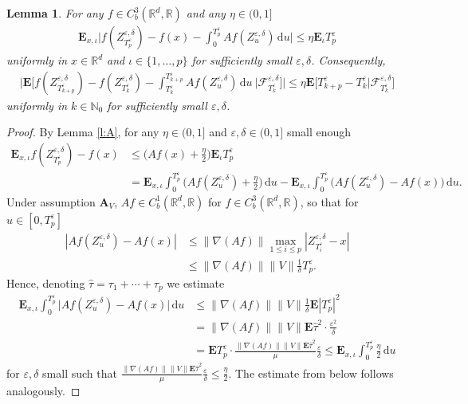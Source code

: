 \documentclass[10pt]{article}
\newcommand{\E}{\mathbf{E}}
\newcommand{\1}{1\!\!\!\;{\rm I}}
\theoremstyle{plain}
\newtheorem{lem}[thm]{Lemma}
\theoremstyle{definition}
\newcommand{\e}{\varepsilon}
\newcommand{\ba}{\begin{equation}\begin{aligned}}
\newcommand{\ea}{\end{aligned}\end{equation}}
\newcommand{\di}{\mathrm{d}}
\newcommand{\rF}{\mathscr{F}}
\newcommand{\bR}{\mathbb{R}}
\numberwithin{equation}{section}
\begin{document}
\begin{lem}
\label{l:estA}
For any $f\in C^3_b(\bR^d,\bR)$ and
any
$\eta\in(0,1]$
\ba
\E_{x,\iota}\Big| f(Z^{\e,\delta}_{T_p^\e}) - f(x) - \int_0^{T^\e_p} Af(Z^{\e,\delta}_u)\,\di u\Big|
\leq \eta \E_{\iota} T^\e_p
\ea
uniformly in $x\in\bR^d$ and $\iota\in\{1,\dots,p\}$ for sufficiently small $\e,\delta$.
Consequently,
\ba
\Big|\E\Big[ f(Z^{\e,\delta}_{T_{k+p}^\e}) - f(Z^{\e,\delta}_{T_{k}^\e})
- \int_{T_{k}^\e}^{T_{k+p}^\e} Af(Z^{\e,\delta}_u) \,\di u\     \Big|\rF^{\e,\delta}_{T_{k}^\e} \Big]\Big|
\leq \eta  \E\Big[ T_{k+p}^\e-T_{k}^\e \Big|\rF^{\e,\delta}_{T_{k}^\e} \Big]
\ea
uniformly in  $k\in\mathbb N_0$ for sufficiently small $\e,\delta$.
\end{lem}
\begin{proof}
By Lemma \ref{l:A}, for any $\eta\in(0,1]$ and $\e,\delta\in(0,1]$ small enough
\ba
\E_{x,\iota} f(Z^{\e,\delta}_{T^\e_{p}}) - f(x)
&\leq \Big(A f(x) +\frac{\eta}{2}\Big)\E_{\iota}T_p^\e\\
&= \E_{x,\iota}\int_0^{T_p^\e} \Big(A f(Z^{\e,\delta}_u) + \frac{\eta}{2}\Big)\,\di u
-\E_{x,\iota}\int_0^{T_p^\e} \Big(A f(Z^{\e,\delta}_u) -Af(x)\Big)\,\di u.
\ea
Under assumption $\mathbf{A}_V$, $Af\in C^1_b(\bR^d,\bR)$ for  $f\in C^3_b(\bR^d,\bR)$, so that
for $u\in[0,T_p^\e]$
\ba
|A f(Z^{\e,\delta}_u) -Af(x)| & \leq \|\nabla (Af)\| \max_{1\leq i\leq p}|Z^{\e,\delta}_{T^\e_i} - x|\\
&\leq \|\nabla (Af)\| \|V\|   \frac{1}{\delta }T_p^\e.
\ea
Hence, denoting $\widehat \tau=\tau_1+\cdots+\tau_p$ we estimate
\ba
\E_{x,\iota}\int_0^{T_p^\e} \Big|A f(Z^{\e,\delta}_u) -Af(x)\Big|\,\di u
&\leq \|\nabla (Af)\| \|V\|
\frac{1}{\delta}\E |T_p^\e|^2\\
&=\|\nabla (Af)\| \|V\| \E\widehat\tau^2 \cdot
\frac{\e^2}{\delta}\\
&=\E T_p^\e \cdot \frac{\|\nabla (Af)\| \|V\| \E\widehat\tau^2}{\mu} \frac{\e}{\delta}
\leq\E_{x,\iota}\int_0^{T_p^\e} \frac{\eta}{2}\,\di u
\ea
for $\e,\delta$ small such that $   \frac{\|\nabla (Af)\| \|V\| \E\widehat\tau^2}{\mu} \frac{\e}{\delta}   \leq\frac{\eta}{2}$.
The estimate from below follows analogously.
\end{proof}
\end{document}
